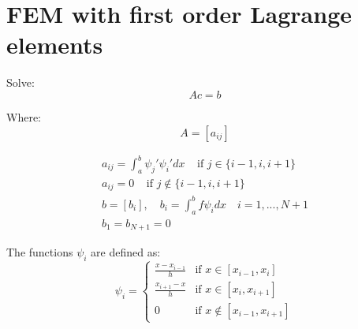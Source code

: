 \documentclass{article}
\begin{document}
\section{FEM with first order Lagrange elements}
\noindent Solve:
\begin{equation*}
    Ac=b
\end{equation*}

\noindent Where:
\begin{equation*}
    A=[a_{ij}]
\end{equation*}

\begin{gather}
     a_{ij}=\int_a^b \psi_j' \psi_i' dx \;\;\;\;\text{if } j\in\{ i-1,i,i+1\}  \\
     a_{ij}=0 \;\;\;\;\text{if } j\notin\{ i-1,i,i+1\} \\
     b=[b_i], \quad b_{i}=\int_a^b f \psi_i dx \quad
     i=1,...,N+1 \\
     b_1 = b_{N+1} = 0 
\end{gather}


\noindent The functions $\psi_i$ are defined as:
\[\psi_i= \left\{
\begin{array}{rcl}
\frac{x-x_{i-1}}{h}& \text{if } x\in [x_{i-1}, x_i]\\
\frac{x_{i+1}-x}{h}& \text{if } x\in [x_{i}, x_{i+1}]\\
0& \text{if } x\notin [x_{i-1}, x_{i+1}]
\end{array}\right.\]
\end{document}
